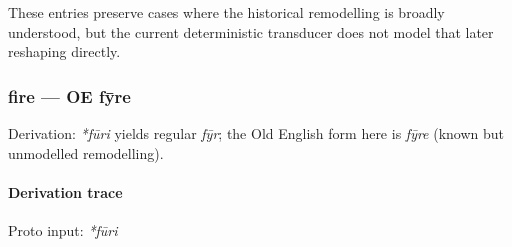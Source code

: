 \documentclass[
  british,
  a4paper,
]{article}
\begin{document}
These entries preserve cases where the historical remodelling is broadly
understood, but the current deterministic transducer does not model that
later reshaping directly.

\subsubsection{fire --- OE fȳre}\label{fire-oe-fux233re}

Derivation: \emph{*fūri} yields regular \emph{fȳr}; the Old English form
here is \emph{fȳre} (known but unmodelled remodelling).

\paragraph{Derivation trace}\label{derivation-trace-70}

Proto input: \emph{*fūri}

\begingroup
\setlength{\fboxsep}{6pt}

\noindent{} \endgroup
\end{document}
